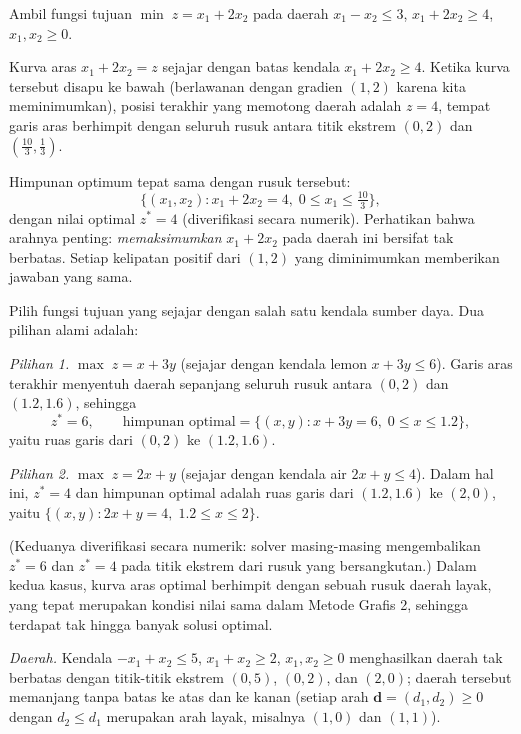Ambil fungsi tujuan $\min\; z = x_1 + 2x_2$ pada daerah $x_1 - x_2 \leq 3$, $x_1 + 2x_2 \geq 4$, $x_1, x_2 \geq 0$.

Kurva aras $x_1 + 2x_2 = z$ sejajar dengan batas kendala $x_1 + 2x_2 \geq 4$. Ketika kurva tersebut disapu ke bawah (berlawanan dengan gradien $(1,2)$ karena kita meminimumkan), posisi terakhir yang memotong daerah adalah $z = 4$, tempat garis aras berhimpit dengan seluruh rusuk antara titik ekstrem $(0, 2)$ dan $(\tfrac{10}{3}, \tfrac{1}{3})$.

Himpunan optimum tepat sama dengan rusuk tersebut:
\[
\{ (x_1, x_2) : x_1 + 2x_2 = 4,\; 0 \leq x_1 \leq \tfrac{10}{3} \},
\]
dengan nilai optimal $z^* = 4$ (diverifikasi secara numerik). Perhatikan bahwa arahnya penting: \emph{memaksimumkan} $x_1 + 2x_2$ pada daerah ini bersifat tak berbatas. Setiap kelipatan positif dari $(1,2)$ yang diminimumkan memberikan jawaban yang sama.

Pilih fungsi tujuan yang sejajar dengan salah satu kendala sumber daya. Dua pilihan alami adalah:

\emph{Pilihan 1.} $\max\; z = x + 3y$ (sejajar dengan kendala lemon $x + 3y \leq 6$). Garis aras terakhir menyentuh daerah sepanjang seluruh rusuk antara $(0,2)$ dan $(1.2, 1.6)$, sehingga
\[
z^* = 6, \qquad \text{himpunan optimal} = \{ (x, y) : x + 3y = 6,\; 0 \leq x \leq 1.2 \},
\]
yaitu ruas garis dari $(0,2)$ ke $(1.2, 1.6)$.

\emph{Pilihan 2.} $\max\; z = 2x + y$ (sejajar dengan kendala air $2x + y \leq 4$). Dalam hal ini, $z^* = 4$ dan himpunan optimal adalah ruas garis dari $(1.2, 1.6)$ ke $(2, 0)$, yaitu $\{ (x,y) : 2x + y = 4,\; 1.2 \leq x \leq 2 \}$.

(Keduanya diverifikasi secara numerik: solver masing-masing mengembalikan $z^* = 6$ dan $z^* = 4$ pada titik ekstrem dari rusuk yang bersangkutan.) Dalam kedua kasus, kurva aras optimal berhimpit dengan sebuah rusuk daerah layak, yang tepat merupakan kondisi nilai sama dalam Metode Grafis 2, sehingga terdapat tak hingga banyak solusi optimal.

\emph{Daerah.} Kendala $-x_1 + x_2 \leq 5$, $x_1 + x_2 \geq 2$, $x_1, x_2 \geq 0$ menghasilkan daerah tak berbatas dengan titik-titik ekstrem $(0,5)$, $(0,2)$, dan $(2,0)$; daerah tersebut memanjang tanpa batas ke atas dan ke kanan (setiap arah $\mathbf d = (d_1, d_2) \geq 0$ dengan $d_2 \leq d_1$ merupakan arah layak, misalnya $(1,0)$ dan $(1,1)$).

